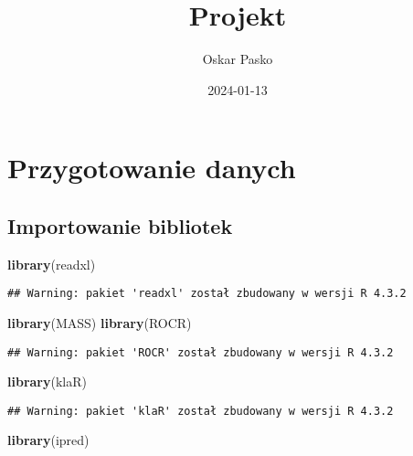 \documentclass[
]{article}
\title{Projekt}
\author{Oskar Pasko}
\date{2024-01-13}
\newenvironment{Shaded}{\begin{snugshade}}{\end{snugshade}}
\newcommand{\FunctionTok}[1]{\textcolor[rgb]{0.13,0.29,0.53}{\textbf{#1}}}
\newcommand{\NormalTok}[1]{#1}
\begin{document}
\maketitle

\hypertarget{przygotowanie-danych}{%
\section{Przygotowanie danych}\label{przygotowanie-danych}}

\hypertarget{importowanie-bibliotek}{%
\subsection{Importowanie bibliotek}\label{importowanie-bibliotek}}

\begin{Shaded}
\begin{Highlighting}[]
\FunctionTok{library}\NormalTok{(readxl)}
\end{Highlighting}
\end{Shaded}

\begin{verbatim}
## Warning: pakiet 'readxl' został zbudowany w wersji R 4.3.2
\end{verbatim}

\begin{Shaded}
\begin{Highlighting}[]
\FunctionTok{library}\NormalTok{(MASS)}
\FunctionTok{library}\NormalTok{(ROCR)}
\end{Highlighting}
\end{Shaded}

\begin{verbatim}
## Warning: pakiet 'ROCR' został zbudowany w wersji R 4.3.2
\end{verbatim}

\begin{Shaded}
\begin{Highlighting}[]
\FunctionTok{library}\NormalTok{(klaR)}
\end{Highlighting}
\end{Shaded}

\begin{verbatim}
## Warning: pakiet 'klaR' został zbudowany w wersji R 4.3.2
\end{verbatim}

\begin{Shaded}
\begin{Highlighting}[]
\FunctionTok{library}\NormalTok{(ipred)}
\end{Highlighting}
\end{Shaded}
\end{document}
